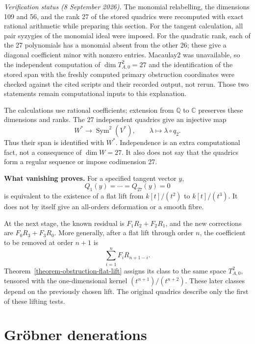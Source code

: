 \noindent
\emph{Verification status (8 September
2026).} The monomial relabelling, the
dimensions 109 and 56, and the rank 27 of
the stored quadrics were recomputed with
exact rational arithmetic while preparing
this section. For the tangent calculation,
all pair syzygies of the monomial ideal
were imposed. For the quadratic rank,
each of the 27 polynomials has a monomial
absent from the other 26; these give a
diagonal coefficient minor with nonzero
entries. Macaulay2 was unavailable, so the
independent computation of
$\dim T^2_{A,0}=27$ and the identification
of the stored span with the freshly
computed primary obstruction coordinates
were checked against the cited scripts
and their recorded output, not rerun.
Those two statements remain computational
inputs to this explanation.

The calculations use rational coefficients;
extension from $\mathbb{Q}$ to
$\mathbb{C}$ preserves these dimensions
and ranks. The 27 independent quadrics
give an injective map
$$
W^*\longrightarrow
\operatorname{Sym}^2(V^*),\qquad
\lambda\longmapsto\lambda\circ q_2.
$$
Thus their span is identified with $W^*$.
Independence is an extra computational
fact, not a consequence of $\dim W=27$.
It also does not say that the quadrics
form a regular sequence or impose
codimension 27.

\medskip\noindent
\textbf{What vanishing proves.}
For a specified tangent vector $y$,
$$
Q_1(y)=\cdots=Q_{27}(y)=0
$$
is equivalent to the existence of a flat
lift from $k[t]/(t^2)$ to $k[t]/(t^3)$.
It does not by itself give an all-orders
deformation or a smooth fibre.

At the next stage, the known residual is
$F_1R_2+F_2R_1$, and the new corrections
are $F_0R_3+F_3R_0$. More generally, after
a flat lift through order $n$, the
coefficient to be removed at order $n+1$
is
$$
\sum_{i=1}^n F_iR_{n+1-i}.
$$
Theorem~\ref{theorem-obstruction-flat-lift}
assigns
its class to the same space $T^2_{A,0}$,
tensored with the one-dimensional kernel
$(t^{n+1})/(t^{n+2})$. These later classes
depend on the previously chosen lift.
The original quadrics describe only the
first of these lifting tests.

\section{Gröbner denerations}
\label{section-grobner-degenerations}

